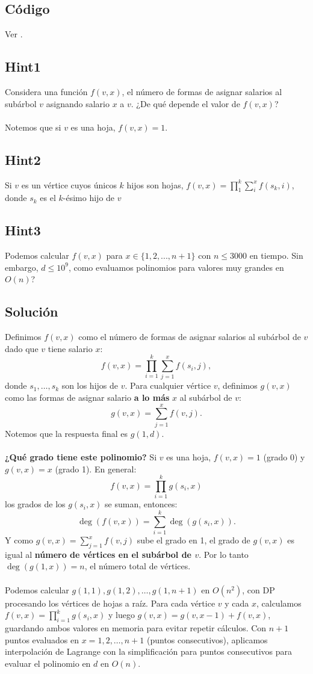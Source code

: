 \subsection*{Código}
Ver .

\subsection*{Hint1}
Considera una función $f(v,x)$, el número de formas de asignar salarios al subárbol $v$ asignando salario $x$ a $v$. ¿De qué depende el valor de $f(v,x)$?
\\\\Notemos que si $v$ es una hoja, $f(v,x)=1$.
\subsection*{Hint2}
 Si $v$ es un vértice cuyos únicos $k$ hijos son hojas, $f(v,x)=\prod_{1}^{k} \sum_{i}^{x} f(s_k,i)$, donde $s_k$ es el $k$-ésimo hijo de $v$
\subsection*{Hint3}
Podemos calcular $f(v,x)$ para $x \in \{1,2,...,n+1\}$ con $n\leq 3000$ en tiempo. Sin embargo, $d\leq 10^9$, como evaluamos polinomios para valores muy grandes en $O(n)$?
\subsection*{Solución}
Definimos $f(v,x)$ como el número de formas de asignar salarios al
subárbol de $v$ dado que $v$ tiene salario $x$:
\[
f(v,x)=\prod_{i=1}^{k} \sum_{j=1}^{x} f(s_i,j),
\]
donde $s_1,\ldots,s_k$ son los hijos de $v$. Para cualquier vértice $v$,
definimos $g(v,x)$ como las formas de asignar salario \textbf{a lo
más} $x$ al subárbol de $v$:
\[
g(v,x)=\sum_{j=1}^{x} f(v,j).
\]
Notemos que la respuesta final es $g(1,d)$.
\\\\
\textbf{¿Qué grado tiene este polinomio?} Si $v$ es una hoja,
$f(v,x)=1$ (grado 0) y $g(v,x)=x$ (grado 1). En general:
\[
f(v,x)=\prod_{i=1}^{k}g(s_i,x)
\]
los grados de los $g(s_i,x)$ se suman, entonces:
\[
\deg(f(v,x))=\sum_{i=1}^{k} \deg(g(s_i,x)).
\]
Y como $g(v,x)=\sum_{j=1}^{x}f(v,j)$ sube el grado en 1, el grado
de $g(v,x)$ es igual al \textbf{número de vértices en el subárbol de $v$}.
Por lo tanto $\deg(g(1,x)) = n$, el número total de vértices.
\\\\
Podemos calcular $g(1,1), g(1,2), \ldots, g(1,n+1)$ en $O(n^2)$, con DP procesando los vértices de hojas a raíz. Para cada vértice $v$ y cada $x$, calculamos $f(v,x) = \prod_{i=1}^{k} g(s_i,x)$ y luego $g(v,x) = g(v,x-1) + f(v,x)$, guardando ambos valores en memoria
para evitar repetir cálculos. Con $n+1$ puntos evaluados en $x=1,2,\ldots,n+1$ (puntos consecutivos), aplicamos interpolación de Lagrange con la simplificación para puntos consecutivos para evaluar el polinomio en $d$ en $O(n)$.
